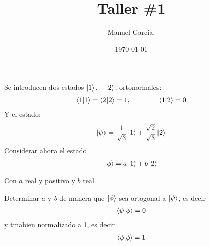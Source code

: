 \documentclass{article}
\title{Taller \#1}
\author{Manuel Garcia.}
\date{\today}
\begin{document}
\maketitle

\section{}
Se introducen dos estados $ \ket{1 }, \quad \ket{2 } $, ortonormales: 
\begin{gather}
  \bra{1}\ket{1} = \bra{2}\ket{2} = 1 ,\qquad \qquad \bra{1}\ket{2 } = 0 
\end{gather}
Y el estado: 
\begin{gather}
  \ket{\psi } = \frac{1}{\sqrt{3 } }\ket{1 } + \frac{\sqrt{2 } }{\sqrt{3 } }\ket{2 }
\end{gather}
Considerar ahora el estado 
\begin{gather}
  \ket{\phi } = a \ket{1 } + b \ket{2 }
\end{gather}

Con $ a  $ real y positivo y $ b  $ real. 

Determinar $ a  $ y $ b  $ de manera que $ \ket{\phi } $ sea ortogonal a $ \ket{\psi } $, es decir 
\begin{gather}
  \bra{\psi }\ket{\phi  } = 0  
\end{gather}
y tmabien normalizado a 1, es decir 
\begin{gather}
  \bra{\phi }\ket{\phi } = 1  
\end{gather}
\end{document}

